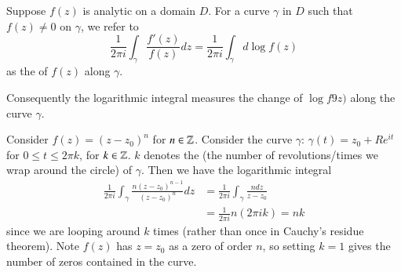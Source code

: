 \documentclass[12pt, a4paper, oneside, openright, titlepage]{book}
\begin{document}
\begin{defn}
    Suppose $f(z)$ is analytic on a domain $D$. For a curve $\gamma$ in $D$ such that $f(z) \neq 0$ on $\gamma$, we refer to \begin{equation*}
        \frac{1}{2\pi i}\int_{\gamma}\frac{f'(z)}{f(z)}dz = \frac{1}{2\pi i}\int_{\gamma}d\log f(z)
    \end{equation*}
    as the  of $f(z)$ along $\gamma$.
\end{defn}

Consequently the logarithmic integral measures the change of $\log f9z)$ along the curve $\gamma$.

\begin{eg}
    Consider $f(z) = (z-z_0)^n$ for $n \in \mathbb Z$. Consider the curve $\gamma$: $\gamma(t) = z_0+Re^{it}$ for $0 \leq t \leq 2\pi k$, for $k \in \mathbb Z$. $k$ denotes the  (the number of revolutions/times we wrap around the circle) of $\gamma$. Then we have the logarithmic integral \begin{align*}
        \frac{1}{2\pi i}\int_{\gamma}\frac{n(z-z_0)^{n-1}}{(z-z_0)^n}dz &= \frac{1}{2\pi i}\int_{\gamma}\frac{ndz}{z-z_0} \\
        &= \frac{1}{2\pi i}n(2\pi i k) = nk
    \end{align*}
    since we are looping around $k$ times (rather than once in Cauchy's residue theorem). Note $f(z)$ has $z=z_0$ as a zero of order $n$, so setting $k = 1$ gives the number of zeros contained in the curve.
\end{eg}
\end{document}
